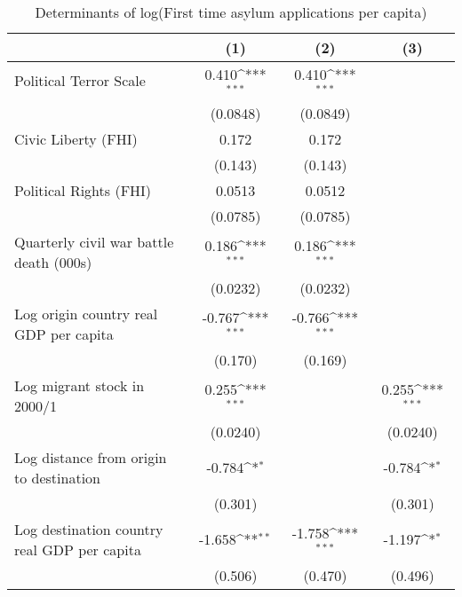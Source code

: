 \begin{table}[htbp]\centering
\def\sym#1{\ifmmode^{#1}\else\(^{#1}\)\fi}
\caption{Determinants of log(First time asylum applications per capita)}
\begin{tabular}{l*{3}{c}}
\hline\hline
                    &\multicolumn{1}{c}{(1)}         &\multicolumn{1}{c}{(2)}         &\multicolumn{1}{c}{(3)}         \\
\hline
Political Terror Scale&       0.410\sym{***}&       0.410\sym{***}&                     \\
                    &    (0.0848)         &    (0.0849)         &                     \\
[1em]
Civic Liberty (FHI) &       0.172         &       0.172         &                     \\
                    &     (0.143)         &     (0.143)         &                     \\
[1em]
Political Rights (FHI)&      0.0513         &      0.0512         &                     \\
                    &    (0.0785)         &    (0.0785)         &                     \\
[1em]
Quarterly civil war battle death (000s)&       0.186\sym{***}&       0.186\sym{***}&                     \\
                    &    (0.0232)         &    (0.0232)         &                     \\
[1em]
Log origin country real GDP per capita&      -0.767\sym{***}&      -0.766\sym{***}&                     \\
                    &     (0.170)         &     (0.169)         &                     \\
[1em]
Log migrant stock in 2000/1&       0.255\sym{***}&                     &       0.255\sym{***}\\
                    &    (0.0240)         &                     &    (0.0240)         \\
[1em]
Log distance from origin to destination&      -0.784\sym{*}  &                     &      -0.784\sym{*}  \\
                    &     (0.301)         &                     &     (0.301)         \\
[1em]
Log destination country real GDP per capita&      -1.658\sym{**} &      -1.758\sym{***}&      -1.197\sym{*}  \\
                    &     (0.506)         &     (0.470)         &     (0.496)         \\

\end{tabular}
\end{table}
